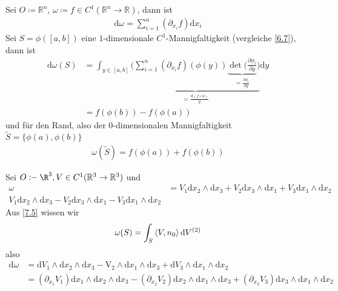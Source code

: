 \begin{example} \label{8.4}
  \begin{enum-arab}
    \item
      Sei $O \coloneq \mathbb{R}^n$, $\omega \coloneq f \in C^1 (\mathbb{R}^n \to \mathbb{R})$, dann ist
      \begin{align*}
        \mathrm d \omega = \sum_{i=1}^n (\partial_{x_i}f) \mathrm d x_i
      \end{align*}
      Sei $S = \phi([a,b])$ eine $1$-dimensionale $C^1$-Mannigfaltigkeit (vergleiche \ref{6.7}), dann ist
      \begin{align*}
        \mathrm d \omega(S) &= \int_{y \in [a,b]} \underbrace{\bigg( \sum_{i=1}^n (\partial_{x_i}f)(\phi(y)) \underbrace{\det ( \tfrac{\partial \phi_i}{\partial y}}_{= \frac{\partial \phi_i}{\partial y}} \bigg)}_{= \frac{\mathrm d (f\circ \phi)}{y}} \mathrm d y \\
        &= f(\phi(b)) - f(\phi(a))
      \end{align*}
      und für den Rand, also der $0$-dimensionalen Mannigfaltigkeit $\tilde S = \{\phi(a), \phi(b)\}$
      \begin{align*}
        \omega(\tilde S) = f(\phi(a)) + f(\phi(b))
      \end{align*}
    \item
      Sei $O \coloneq \R^3, V \in C^1 (\mathbb{R}^3 \to \mathbb{R}^3)$ und
      \begin{align*}
        \omega &= V_1 \mathrm d x_2 \wedge \mathrm d x_3 + V_2 \mathrm d x_3 \wedge \mathrm d x_1 + V_3 \mathrm d x_1 \wedge \mathrm d x_2 \\
        V_1 \mathrm d x_2 \wedge \mathrm d x_3 - V_2 \mathrm d x_3 \wedge \mathrm d x_1 - V_3 \mathrm d x_1 \wedge \mathrm d x_2
      \end{align*}
      Aus \ref{7.5} wissen wir
      \begin{align*}
        \omega(S) = \int_S \braket{V, n_0} \mathrm d V^{(2)}
      \end{align*}
      also
      \begin{align*}
        \mathrm d \omega &= \mathrm d V_1 \wedge \mathrm d x_2 \wedge \mathrm d x_3 - \mathrm V_2 \wedge \mathrm d x_1 \wedge \mathrm d x_3 + \mathrm d V_3 \wedge \mathrm d x_1 \wedge \mathrm d x_2 \\
        &= (\partial_{x_1} V_1) \mathrm d x_1 \wedge \mathrm d x_2 \wedge \mathrm d x_3 - (\partial_{x_2} V_2) \mathrm d x_2 \wedge \mathrm d x_1 \wedge \mathrm d x_3 + (\partial_{x_3} V_3) \mathrm d x_3 \wedge \mathrm d x_1 \wedge \mathrm d x_2 \\

\end{align*}
\end{enum-arab}
\end{example}

